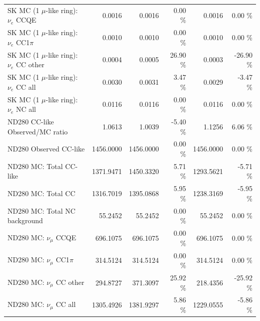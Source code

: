 \begin{table}
\begin{tabular}{| l | r | r  r | r  r |}
                             SK MC (1 $\mu$-like ring): $\nu_{e}$ CCQE &          0.0016 &          0.0016 &  0.00 \%  &          0.0016 &  0.00 \%  \\ 
                         SK MC (1 $\mu$-like ring): $\nu_{e}$ CC1$\pi$ &          0.0010 &          0.0010 &  0.00 \%  &          0.0010 &  0.00 \%  \\ 
                         SK MC (1 $\mu$-like ring): $\nu_{e}$ CC other &          0.0004 &          0.0005 & 26.90 \%  &          0.0003 & -26.90 \%  \\ 
                           SK MC (1 $\mu$-like ring): $\nu_{e}$ CC all &          0.0030 &          0.0031 &  3.47 \%  &          0.0029 & -3.47 \%  \\ 
                           SK MC (1 $\mu$-like ring): $\nu_{e}$ NC all &          0.0116 &          0.0116 &  0.00 \%  &          0.0116 &  0.00 \%  \\ 
\hline
                                       ND280 CC-like Observed/MC ratio &          1.0613 &          1.0039 & -5.40 \%  &          1.1256 &  6.06 \%  \\ 
                                                ND280 Observed CC-like &       1456.0000 &       1456.0000 &  0.00 \%  &       1456.0000 &  0.00 \%  \\ 
                                               ND280 MC: Total CC-like &       1371.9471 &       1450.3320 &  5.71 \%  &       1293.5621 & -5.71 \%  \\ 
                                                    ND280 MC: Total CC &       1316.7019 &       1395.0868 &  5.95 \%  &       1238.3169 & -5.95 \%  \\ 
                                         ND280 MC: Total NC background &         55.2452 &         55.2452 &  0.00 \%  &         55.2452 &  0.00 \%  \\ 
\hline
                                            ND280 MC: $\nu_{\mu}$ CCQE &        696.1075 &        696.1075 &  0.00 \%  &        696.1075 &  0.00 \%  \\ 
                                        ND280 MC: $\nu_{\mu}$ CC1$\pi$ &        314.5124 &        314.5124 &  0.00 \%  &        314.5124 &  0.00 \%  \\ 
                                        ND280 MC: $\nu_{\mu}$ CC other &        294.8727 &        371.3097 & 25.92 \%  &        218.4356 & -25.92 \%  \\ 
                                          ND280 MC: $\nu_{\mu}$ CC all &       1305.4926 &       1381.9297 &  5.86 \%  &       1229.0555 & -5.86 \%  \\ 

\end{tabular}
\end{table}
